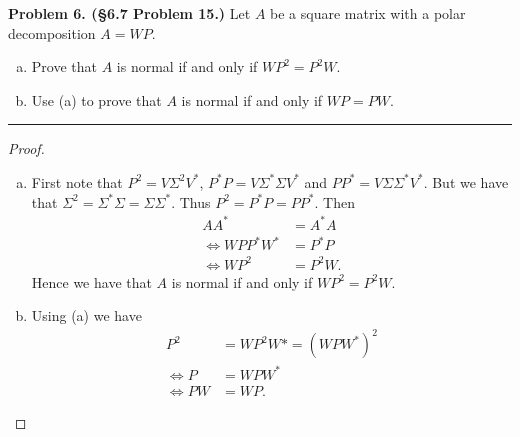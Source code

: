 \documentclass[leqno]{article}
\theoremstyle{nonumberplain}
\newtheorem{proof}{Proof}
\begin{document}


\noindent\textbf{Problem 6. (\S 6.7 Problem 15.)} Let $A$ be a square matrix with a polar decomposition $A=WP$. 
\begin{enumerate}[(a)]
\item Prove that $A$ is normal if and only if $WP^2=P^2W$.
\item Use (a) to prove that $A$ is normal if and only if $WP=PW$.
\end{enumerate}


\noindent\rule[0.5ex]{\linewidth}{1pt}

\begin{proof}~
\begin{enumerate}[(a)]

\item First note that $P^2=V\Sigma^2 V^*$, $P^*P=V\Sigma^* \Sigma V^*$ and $PP^*=V\Sigma \Sigma^* V^*$. But we have that $\Sigma^2=\Sigma^* \Sigma= \Sigma \Sigma^*$. Thus $P^2=P^*P=PP^*$.  Then
\begin{align*}
AA^*&=A^*A\\
\iff WPP^*W^*&=P^*P\\
\iff WP^2&=P^2W.
\end{align*}
Hence we have that $A$ is normal if and only if $WP^2=P^2W$.

\item Using (a) we have
\begin{align*}
P^2&=WP^2W*=(WPW^*)^2\\
\iff P&=WPW^*\\
\iff PW&=WP.
\end{align*}

\end{enumerate}
\end{proof}

\pagebreak



\end{document}
